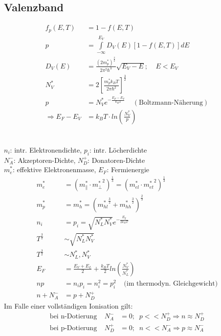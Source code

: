 \documentclass[a4paper,twocolumn,10pt]{article}
\begin{document}
\subsection{Valenzband}
\begin{equation*}
\begin{split}
f_p(E,T)&=1-f(E,T)\\
p&=\int\limits_{-\infty}^{E_V}D_V(E)[1-f(E,T)]dE\\
D_V(E)&=\frac{(2m_p^*)^{\frac{3}{2}}}{2\pi^2\hbar^3}\sqrt{E_V-E};\;\;\;\;E<E_V\\
N_V^*&=2\left[\frac{m_p^*k_BT}{2\pi\hbar^2}\right]^{\frac{3}{2}}\\
p&=N_V^*e^{-\frac{E_F-E_V}{k_BT}}\;\;\;\;(\text{Boltzmann-Näherung})\\
\Rightarrow E_F-E_V&=k_BT\cdot ln\left(\frac{N_V^*}{p}\right)
\end{split}
\end{equation*}\\\\
$n_i$: intr. Elektronendichte, $p_i$: intr. Löcherdichte\\
$N_A^-$: Akzeptoren-Dichte, $N_D^+$: Donatoren-Dichte\\
$m_e^*$: effektive Elektronenmasse, $E_F$: Fermienergie\\
\begin{equation*}
\begin{split}
m_e^*&=\left(m_\parallel^*\cdot{m_\perp^*}^2\right)^{\frac{1}{3}}=\left(m_{el}^*\cdot{m_{et}^*}^2\right)^{\frac{1}{3}}\\
m_p^*&=m_h^*=\left({m_{hl}^*}^{\frac{3}{2}}+{m_{hh}^*}^{\frac{3}{2}}\right)^{\frac{2}{3}}\\
n_i&=p_i=\sqrt{N_L^*N_V^*}e^{-\frac{E_g}{2k_BT}}\\
T^{\frac{3}{2}}&\sim \sqrt{N_L^*N_V^*}\\
T^{\frac{3}{2}}&\sim N_L^*,N_V^*\\
E_F&=\frac{E_V+E_L}{2}+\frac{k_BT}{2}ln\left(\frac{N_V^*}{N_L^*}\right)\\
np&=n_ip_i=n_i^2=p_i^2\;\;\;\;\text{(im thermodyn. Gleichgewicht)}\\
n+N_A^-&=p+N_D^+
\end{split}
\end{equation*}
Im Falle einer vollständigen Ionisation gilt:
\begin{equation*}
\begin{split}
\text{bei n-Dotierung}\;\;\;\;N_A^-&=0;\;\;p<<N_D^+\Rightarrow n\approx N_D^+\\
\text{bei p-Dotierung}\;\;\;\;N_D^+&=0;\;\;n<<N_A^-\Rightarrow p\approx N_A^-
\end{split}
\end{equation*}
\end{document}
